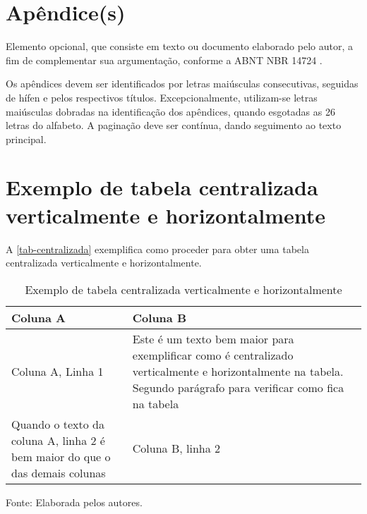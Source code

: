 
\begin{apendicesenv}
\partapendices
\chapter{Apêndice(s)}
Elemento opcional, que consiste em texto ou documento elaborado pelo autor, a fim de complementar sua argumentação, conforme a ABNT NBR 14724 \cite{nbr14724}.

Os apêndices devem ser identificados por letras maiúsculas consecutivas, seguidas de hífen e pelos respectivos títulos. Excepcionalmente, utilizam-se letras maiúsculas dobradas na identificação dos apêndices, quando esgotadas as 26 letras do alfabeto. A paginação deve ser contínua, dando seguimento ao texto principal. \cite{aguia2020}
\chapter{Exemplo de tabela centralizada verticalmente e horizontalmente}
A \autoref{tab-centralizada} exemplifica como proceder para obter uma tabela centralizada verticalmente e horizontalmente.
\begin{table}[htb]
\ABNTEXfontereduzida
\caption[Exemplo de tabela centralizada verticalmente e horizontalmente]{Exemplo de tabela centralizada verticalmente e horizontalmente}
\label{tab-centralizada}

\begin{tabular}{ >{\centering\arraybackslash}m{6cm}  >{\centering\arraybackslash}m{6cm} }
\hline
 \centering \textbf{Coluna A} & \textbf{Coluna B}\\
\hline
  Coluna A, Linha 1 & Este é um texto bem maior para exemplificar como é centralizado verticalmente e horizontalmente na tabela. Segundo parágrafo para verificar como fica na tabela\\
  Quando o texto da coluna A, linha 2 é bem maior do que o das demais colunas  & Coluna B, linha 2\\
\hline
\end{tabular}
\begin{flushleft}
		Fonte: Elaborada pelos autores.\
\end{flushleft}
\end{table}


\end{apendicesenv}
